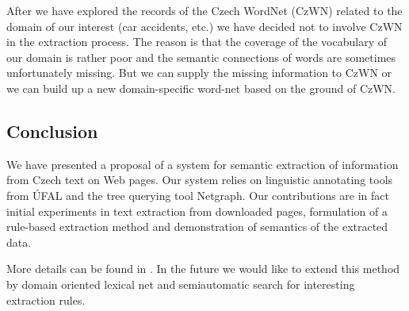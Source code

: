 After we have explored the records of the Czech WordNet (CzWN) related to the domain of our interest (car accidents, etc.) we have decided not to involve CzWN in the extraction process. The reason is that the coverage of the vocabulary of our domain is rather poor and the semantic connections of words are sometimes unfortunately missing. But we can supply the missing information to CzWN or we can build up a new domain-specific word-net based on the ground of CzWN.  


\subsection{Conclusion}


We have presented a proposal of a system for semantic extraction of information from Czech text on Web pages. Our system relies on linguistic annotating tools from ÚFAL and the tree querying tool Netgraph. Our contributions are in fact initial experiments in text extraction from downloaded pages, formulation of a rule-based extraction method and demonstration of semantics of the extracted data.

More details can be found in \citealt{biblio:DedekSemAnot2007}. In the future we would like to extend this method by domain oriented lexical net and semiautomatic search for interesting extraction rules.
